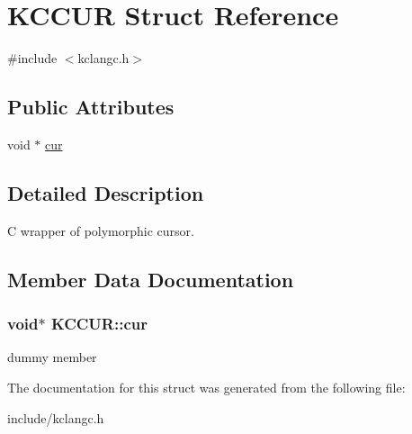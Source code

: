 \hypertarget{structKCCUR}{\section{\-K\-C\-C\-U\-R \-Struct \-Reference}
\label{structKCCUR}
}


{\ttfamily \#include $<$kclangc.\-h$>$}

\subsection*{\-Public \-Attributes}
\begin{DoxyCompactItemize}
\item 
void $\ast$ \hyperlink{structKCCUR_a521b6ac64c18efec3e4b989a41bbe282}{cur}
\end{DoxyCompactItemize}


\subsection{\-Detailed \-Description}
\-C wrapper of polymorphic cursor. 

\subsection{\-Member \-Data \-Documentation}
\hypertarget{structKCCUR_a521b6ac64c18efec3e4b989a41bbe282}{
\subsubsection[{cur}]{\setlength{\rightskip}{0pt plus 5cm}void$\ast$ {\bf \-K\-C\-C\-U\-R\-::cur}}}\label{structKCCUR_a521b6ac64c18efec3e4b989a41bbe282}
dummy member 

\-The documentation for this struct was generated from the following file\-:\begin{DoxyCompactItemize}
\item 
include/kclangc.\-h\end{DoxyCompactItemize}

